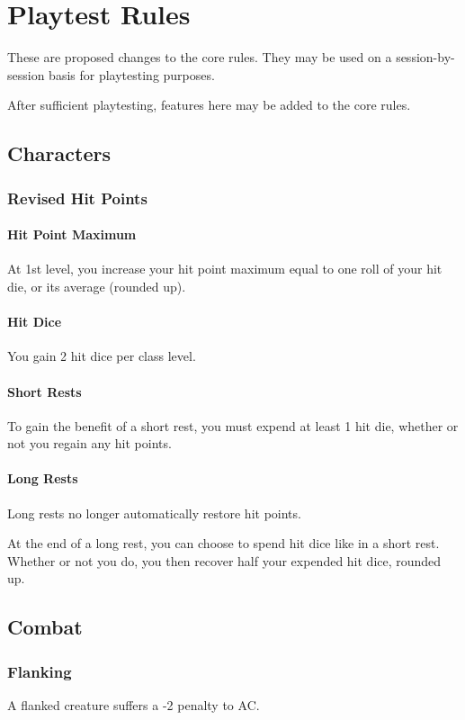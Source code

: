 \documentclass[House_Rules.tex]{subfiles}
\begin{document}
\chapter{Playtest Rules}
These are proposed changes to the core rules. They may be used on a session-by-session basis for playtesting purposes. 

After sufficient playtesting, features here may be added to the core rules.

\section{Characters}

\subsection{Revised Hit Points}

\subsubsection{Hit Point Maximum}
At 1st level, you increase your hit point maximum equal to one roll of your hit die, or its average (rounded up).

\subsubsection{Hit Dice}
You gain 2 hit dice per class level. 

\subsubsection{Short Rests}
To gain the benefit of a short rest, you must expend at least 1 hit die, whether or not you regain any hit points.

\subsubsection{Long Rests}
Long rests no longer automatically restore hit points.

At the end of a long rest, you can choose to spend hit dice like in a short rest. Whether or not you do, you then recover half your expended hit dice, rounded up.

\section{Combat}

\subsection{Flanking}
A flanked creature suffers a -2 penalty to AC.
\end{document}

